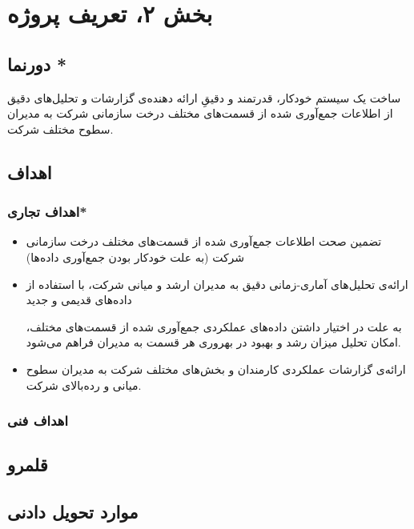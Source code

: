 \chapter{بخش ۲، تعریف پروژه\\}
\section{دورنما *}
ساخت یک سیستم خودکار، قدرتمند و دقیقِ ارائه دهنده‌ی گزارشات و تحلیل‌های دقیق از اطلاعات جمع‌آوری شده از قسمت‌های مختلف درخت سازمانی شرکت  به مدیران سطوح مختلف شرکت.

\section{اهداف }
\subsection{اهداف تجاری*}
\begin{itemize}
\item 
تضمین صحت اطلاعات جمع‌آوری شده از قسمت‌های مختلف درخت سازمانی شرکت (به علت خودکار بودن جمع‌آوری داده‌ها)
\item 
ارائه‌ی تحلیل‌های آماری-زمانی دقیق به مدیران ارشد و میانی شرکت، با استفاده از داده‌های قدیمی و جدید

به علت در اختیار‌ داشتن داده‌های عملکردی جمع‌آوری شده از قسمت‌های مختلف، امکان تحلیل میزان رشد و بهبود در بهروری هر قسمت به مدیران فراهم می‌شود.
\item 
ارائه‌ی گزارشات عملکردی کارمندان و بخش‌های مختلف شرکت به مدیران سطوح میانی و رده‌بالای شرکت.
\end{itemize}
\subsection{اهداف فنی}
\section{قلمرو }
\section{موارد تحویل دادنی }
